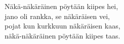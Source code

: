 
            Näkä-näkäräinen pöytään kiipes hei, \\
            jano oli rankka, se näkäräisen vei, \\
            pojat kun kurkkuun näkäräisen kaas, \\
            näkä-näkäräinen pöytään kiipes taas. \\
